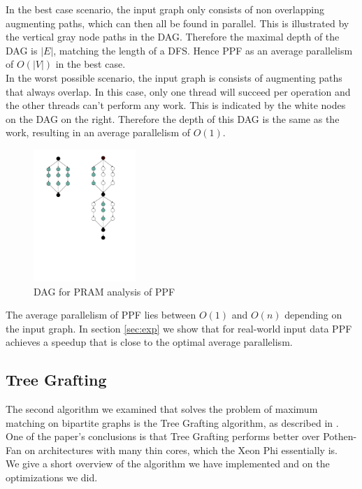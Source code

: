 \documentclass[letterpaper]{article}
\begin{document}
In the best case scenario, the input graph only consists of non overlapping augmenting paths, which can then all be found in parallel. This is illustrated by the vertical gray node paths in the DAG.
Therefore the maximal depth of the DAG is $|E|$, matching the length of a DFS. Hence PPF as an average parallelism of $O(|V|)$ in the best case.\\

In the worst possible scenario, the input graph is consists of augmenting paths that always overlap. In this case, only one thread will succeed per operation and the other threads can't perform any work. This is indicated by the white nodes on the DAG on the right. Therefore the depth of this DAG is the same as the work, resulting in an average parallelism of $O(1)$.\\

\begin{figure}
    \begin{center}
  \includegraphics[height=5cm, trim={2.5cm 8cm 4cm 1cm}, clip]{PRAM.pdf}
  \end{center}
  \caption{DAG for PRAM analysis of PPF}
  \label{fig:pram}
\end{figure}

The average parallelism of PPF lies between $O(1)$ and $O(n)$ depending on the input graph. 
In section \ref{sec:exp} we show that for real-world input data PPF achieves a speedup that is close to the optimal average parallelism.

\subsection{Tree Grafting}\label{sec:tg}

The second algorithm we examined that solves the problem of maximum matching on bipartite graphs is the Tree Grafting algorithm, as described in \cite{Azad:2015}. One of the paper's conclusions is that Tree Grafting performs better over Pothen-Fan on architectures with many thin cores, which the Xeon Phi essentially is. \\
We give a short overview of the algorithm we have implemented and on the optimizations we did. \\
\end{document}
